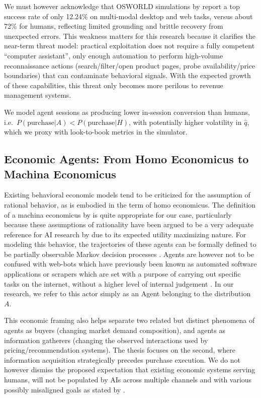 We must however acknowledge that OSWORLD simulations by \textcite{xie_osworld_2024} report a top success rate of only 12.24\% on multi-modal desktop and web tasks, versus about 72\% for humans, reflecting limited grounding and brittle recovery from unexpected errors. This weakness matters for this research because it clarifies the near-term threat model: practical exploitation does not require a fully competent ``computer assistant'', only enough automation to perform high-volume reconnaissance actions (search/filter/open product pages, probe availability/price boundaries) that can contaminate behavioral signals. With the expected growth of these capabilities, this threat only becomes more perilous to revenue management systems.

We model agent sessions as producing lower in-session conversion than humans, i.e.\ $P(\text{purchase} \vert A) < P(\text{purchase} \vert H)$, with potentially higher volatility in $\hat{q}$, which we proxy with look-to-book metrics in the simulator.

\subsection{Economic Agents: From Homo Economicus to Machina Economicus}

Existing behavioral economic models tend to be criticized for the assumption of rational behavior, as is embodied in the term of homo economicus. The definition of a machina economicus by \textcite{parkes_economic_2015} is quite appropriate for our case, particularly because these assumptions of rationality have been argued to be a very adequate reference for AI research by \textcite{varian_economic_1995} due to its expected utility maximizing nature. For modeling this behavior, the trajectories of these agents can be formally defined to be partially observable Markov decision processes \parencite{xie_osworld_2024}. Agents are however not to be confused with web-bots which have previously been known as automated software applications or scrapers which are set with a purpose of carrying out specific tasks on the internet, without a higher level of internal judgement \parencite{imperva_rapid_2025}. In our research, we refer to this actor simply as an Agent belonging to the distribution $A$.

This economic framing also helps separate two related but distinct phenomena of agents as buyers (changing market demand composition), and agents as information gatherers (changing the observed interactions used by pricing/recommendation systems). The thesis focuses on the second, where information acquisition strategically precedes purchase execution. We do not however dismiss the proposed expectation that existing economic systems serving humans, will not be populated by AIs across multiple channels and with various possibly misaligned goals as stated by \textcite{parkes_economic_2015}.

